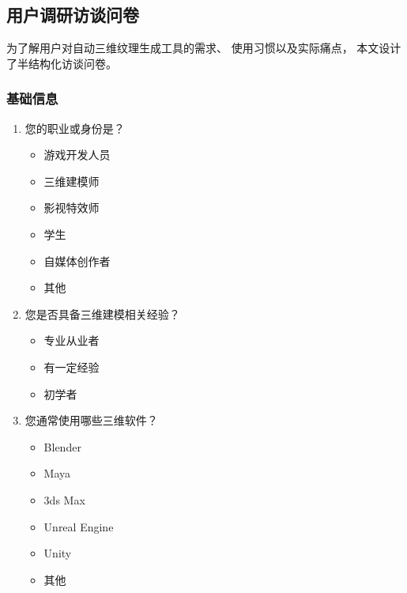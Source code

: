 \cleardoublepage

{

    \appendixsubsecmajornumbering

   \subsection{用户调研访谈问卷}
   \label{app:survey}

    为了解用户对自动三维纹理生成工具的需求、
    使用习惯以及实际痛点，
    本文设计了半结构化访谈问卷。

    \vspace{0.3em}

    \subsubsection{基础信息}

    \begin{enumerate}
        \setlength{\itemsep}{0pt}
        \setlength{\parskip}{0pt}

        \item 您的职业或身份是？
        \begin{itemize}
            \setlength{\itemsep}{0pt}
            \item 游戏开发人员
            \item 三维建模师
            \item 影视特效师
            \item 学生
            \item 自媒体创作者
            \item 其他
        \end{itemize}

        \item 您是否具备三维建模相关经验？
        \begin{itemize}
            \setlength{\itemsep}{0pt}
            \item 专业从业者
            \item 有一定经验
            \item 初学者
        \end{itemize}

        \item 您通常使用哪些三维软件？
        \begin{itemize}
            \setlength{\itemsep}{0pt}
            \item Blender
            \item Maya
            \item 3ds Max
            \item Unreal Engine
            \item Unity
            \item 其他
        \end{itemize}


\end{enumerate}}
